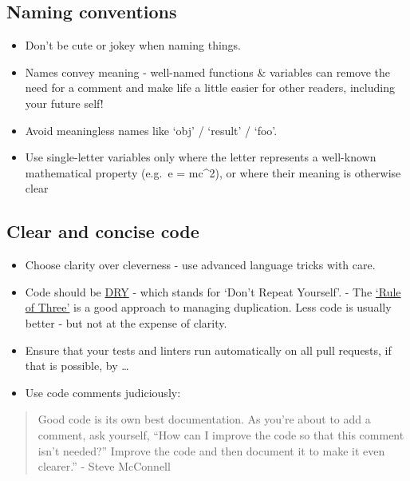 \documentclass[]{book}
\providecommand{\tightlist}{%
  \setlength{\itemsep}{0pt}\setlength{\parskip}{0pt}}
\begin{document}
\hypertarget{names}{%
\subsection{Naming conventions}\label{names}}

\begin{itemize}
\tightlist
\item
  Don't be cute or jokey when naming things.
\item
  Names convey meaning - well-named functions \& variables can remove the need for a comment and make life a little easier for other readers, including your future self!
\item
  Avoid meaningless names like `obj' / `result' / `foo'.
\item
  Use single-letter variables only where the letter represents a well-known mathematical property (e.g.~e = mc\^{}2), or where their meaning is otherwise clear
\end{itemize}

\hypertarget{ccc}{%
\subsection{Clear and concise code}\label{ccc}}

\begin{itemize}
\tightlist
\item
  Choose clarity over cleverness - use advanced language tricks with care.
\item
  Code should be \href{https://en.wikipedia.org/wiki/Don\%27t_repeat_yourself}{DRY} - which stands for `Don't Repeat Yourself'. - The \href{https://en.wikipedia.org/wiki/Rule_of_three_(computer_programming)}{`Rule of Three'} is a good approach to managing duplication. Less code is usually better - but not at the expense of clarity.\\
\item
  Ensure that your tests and linters run automatically on all pull requests, if that is possible, by \ldots{}
\item
  Use code comments judiciously:
\end{itemize}

\begin{quote}
Good code is its own best documentation. As you're about to add a comment, ask yourself, ``How can I improve the code so that this comment isn't needed?'' Improve the code and then document it to make it even clearer.'' - Steve McConnell
\end{quote}
\end{document}
